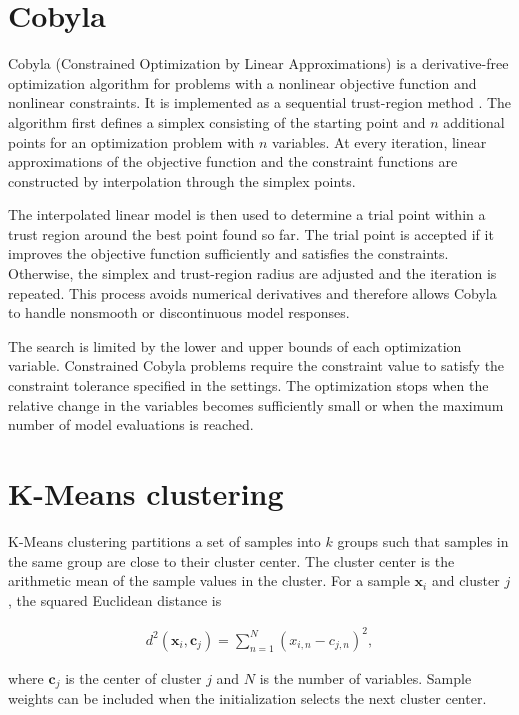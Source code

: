 \section{Cobyla}
\label{sec:CobylaOptimization}

Cobyla (Constrained Optimization by Linear Approximations) is a derivative-free optimization algorithm for problems with a nonlinear objective function and nonlinear constraints.
It is implemented as a sequential trust-region method \cite{Powell1994}.
The algorithm first defines a simplex consisting of the starting point and $n$ additional points for an optimization problem with $n$ variables.
At every iteration, linear approximations of the objective function and the constraint functions are constructed by interpolation through the simplex points.

The interpolated linear model is then used to determine a trial point within a trust region around the best point found so far.
The trial point is accepted if it improves the objective function sufficiently and satisfies the constraints.
Otherwise, the simplex and trust-region radius are adjusted and the iteration is repeated.
This process avoids numerical derivatives and therefore allows Cobyla to handle nonsmooth or discontinuous model responses.

The search is limited by the lower and upper bounds of each optimization variable.
Constrained Cobyla problems require the constraint value to satisfy the constraint tolerance specified in the settings.
The optimization stops when the relative change in the variables becomes sufficiently small or when the maximum number of model evaluations is reached.

\section{K-Means clustering}
\label{sec:KMeansClustering}

K-Means clustering partitions a set of samples into $k$ groups such that samples in the same group are close to their cluster center.
The cluster center is the arithmetic mean of the sample values in the cluster.
For a sample $\mathbf{x}_i$ and cluster $j$, the squared Euclidean distance is

\begin{align}
d^2\left(\mathbf{x}_i,\mathbf{c}_j\right)
= \sum_{n=1}^{N}\left(x_{i,n}-c_{j,n}\right)^2 ,
\end{align}

where $\mathbf{c}_j$ is the center of cluster $j$ and $N$ is the number of variables.
Sample weights can be included when the initialization selects the next cluster center.

